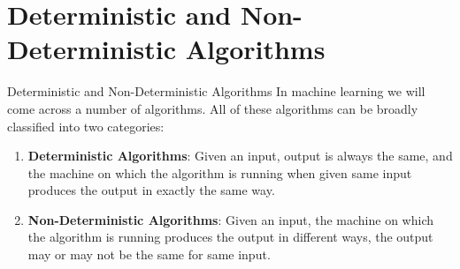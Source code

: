 \documentclass[11pt,notheorems,hyperref={pdfauthor=whatever}]{beamer}
\begin{document}
\section{Deterministic and Non-Deterministic Algorithms}
\begin{frame}{Deterministic and Non-Deterministic Algorithms}
In machine learning we will come across a number of algorithms. All of these algorithms can be broadly classified into two categories:
\begin{enumerate}
    \item \alert{\textbf{Deterministic Algorithms}}: Given an input, output is always the same, and the machine on which the algorithm is running when given same input produces the output in exactly the same way.
    \item \alert{\textbf{Non-Deterministic Algorithms}}: Given an input, the machine on which the algorithm is running produces the output in different ways, the output may or may not be the same for same input. 
\end{enumerate}
\end{frame}
\end{document}
